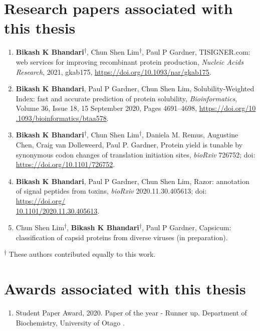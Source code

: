 \section*{Research papers associated with this thesis}
\begin{enumerate}
	
		
	\item \textbf{Bikash K Bhandari}\textsuperscript{$\dagger$}, Chun Shen Lim\textsuperscript{$\dagger$}, Paul P Gardner, TISIGNER.com: web services for improving recombinant protein production, \textit{Nucleic Acids Research}, 2021, gkab175, \href{https://doi.org/10.1093/nar/gkab175}{https://doi.org/10.1093/nar/gkab175}.
	
	\item \textbf{Bikash K Bhandari}, Paul P Gardner, Chun Shen Lim, Solubility-Weighted Index: fast and accurate prediction of protein solubility, \textit{Bioinformatics}, Volume 36, Issue 18, 15 September 2020, Pages 4691–4698, \href{https://doi.org/10.1093/bioinformatics/btaa578}{https://doi.org/10\\.1093/bioinformatics/btaa578}.
	
	\item \textbf{Bikash K Bhandari}\textsuperscript{$\dagger$}, Chun Shen Lim\textsuperscript{$\dagger$}, Daniela M. Remus, Augustine Chen, Craig van Dolleweerd, Paul P. Gardner, Protein yield is tunable by synonymous codon changes of translation initiation sites, \textit{bioRxiv} 726752; doi: \href{https://doi.org/10.1101/726752}{https://doi.org/10.1101/726752}.
	
	
	\item \textbf{Bikash K Bhandari}, Paul P Gardner, Chun Shen Lim, Razor: annotation of signal peptides from toxins, \textit{bioRxiv} 2020.11.30.405613; doi: \href{https://doi.org/10.1101/2020.11.30.405613}{https://doi.org/\\10.1101/2020.11.30.405613}.
	
	\item Chun Shen Lim\textsuperscript{$\dagger$}, \textbf{Bikash K Bhandari}\textsuperscript{$\dagger$}, Paul P Gardner, Capsicum: classification of capsid proteins from diverse viruses (in preparation).


	
\end{enumerate}

\textsuperscript{$\dagger$} These authors contributed equally to this work.



\section*{Awards associated with this thesis}
\begin{enumerate}
	\item Student Paper Award, 2020. Paper of the year - Runner up. Department of Biochemistry, University of Otago \cite{Bhandari2020-pz}.

\end{enumerate}